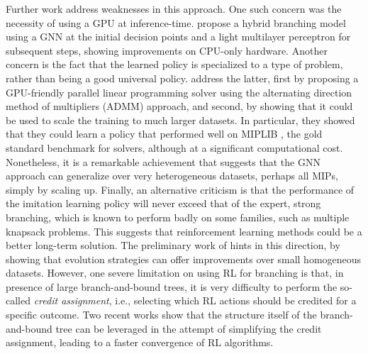 \documentclass[twoside,11pt]{article}
\begin{document}
Further work address weaknesses in this approach. One such concern was the necessity of using a GPU at inference-time. \citet{Gupta2020} propose a hybrid branching model using a GNN at the initial decision points and a light multilayer perceptron for subsequent steps, showing improvements on CPU-only hardware. Another concern is the fact that the learned policy is specialized to a type of problem, rather than being a good universal policy. \citet{nair2020solving} address the latter, first by proposing a GPU-friendly parallel linear programming solver using the alternating direction method of multipliers (ADMM) approach, and second, by showing that it could be used to scale the training to much larger datasets. In particular, they showed that they could learn a policy that performed well on MIPLIB \citep{miplib2017}, the gold standard benchmark for solvers, although at a significant computational cost. Nonetheless, it is a remarkable achievement that suggests that the GNN approach can generalize over very heterogeneous datasets, perhaps all MIPs, simply by scaling up. Finally, an alternative criticism is that the performance of the imitation learning policy will never exceed that of the expert, strong branching, which is known to perform badly on some families, such as multiple knapsack problems. This suggests that reinforcement learning methods could be a better long-term solution. The preliminary work of \citet{Sun2020} hints in this direction, by showing that evolution strategies can offer improvements over small homogeneous datasets. However, one severe limitation on using RL for branching is that,  in presence of large branch-and-bound trees, it is very difficulty to perform the so-called \emph{credit assignment}, i.e., selecting which RL actions should be credited for a specific outcome. Two recent works \citep{conf/cpaior/EtheveABJKS20, arxiv/ScavuzzoYCCGAYL22} show that the structure itself of the branch-and-bound tree can be leveraged in the attempt of simplifying the credit assignment, leading to a faster convergence of RL algorithms.
\end{document}
